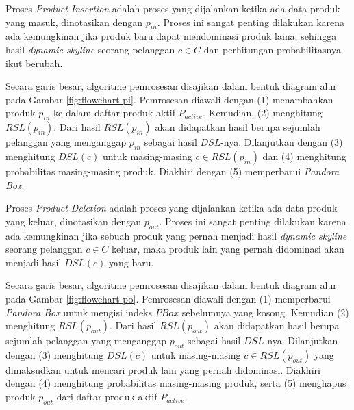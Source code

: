 
Proses \textit{Product Insertion} adalah proses yang dijalankan ketika ada data produk yang masuk, dinotasikan dengan $p_{in}$. Proses ini sangat penting dilakukan karena ada kemungkinan jika produk baru dapat mendominasi produk lama, sehingga hasil \textit{dynamic skyline} seorang pelanggan $c \in C$ dan perhitungan probabilitasnya ikut berubah. 

Secara garis besar, algoritme pemrosesan disajikan dalam bentuk diagram alur pada Gambar \ref{fig:flowchart-pi}. Pemrosesan diawali dengan (1) menambahkan produk $p_{in}$ ke dalam daftar produk aktif $P_{active}$. Kemudian, (2) menghitung $RSL(p_{in})$. Dari hasil $RSL(p_{in})$ akan didapatkan hasil berupa sejumlah pelanggan yang menganggap $p_{in}$ sebagai hasil $DSL$-nya. Dilanjutkan dengan (3) menghitung $DSL(c)$ untuk masing-masing $c \in RSL(p_{in})$ dan (4) menghitung probabilitas masing-masing produk. Diakhiri dengan (5) memperbarui \textit{Pandora Box}. 


Proses \textit{Product Deletion} adalah proses yang dijalankan ketika ada data produk yang keluar, dinotasikan dengan $p_{out}$. Proses ini sangat penting dilakukan karena ada kemungkinan jika sebuah produk yang pernah menjadi hasil \textit{dynamic skyline} seorang pelanggan $c \in C$ keluar, maka produk lain yang pernah didominasi akan menjadi hasil $DSL(c)$ yang baru.

Secara garis besar, algoritme pemrosesan disajikan dalam bentuk diagram alur pada Gambar \ref{fig:flowchart-po}. Pemrosesan diawali dengan (1) memperbarui \textit{Pandora Box} untuk mengisi indeks $PBox$ sebelumnya yang kosong. Kemudian (2) menghitung $RSL(p_{out})$. Dari hasil $RSL(p_{out})$ akan didapatkan hasil berupa sejumlah pelanggan yang menganggap $p_{out}$ sebagai hasil $DSL$-nya. Dilanjutkan dengan (3) menghitung $DSL(c)$ untuk masing-masing $c \in RSL(p_{out})$ yang dimaksudkan untuk mencari produk lain yang pernah didominasi. Diakhiri dengan (4) menghitung probabilitas masing-masing produk, serta (5) menghapus produk $p_{out}$ dari daftar produk aktif $P_{active}$. 

